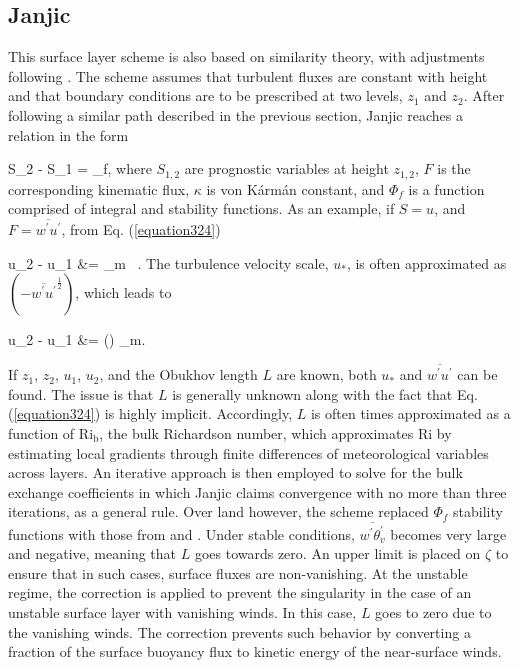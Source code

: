 \subsection{Janjic}
\label{sl-janjic-352}

This surface layer scheme is also based on  \citet{MO} similarity theory, with adjustments following  \citet{Jan94,Jan96,Jan02}. The scheme assumes that turbulent fluxes are constant with height and that boundary conditions are to be prescribed at two levels, $z_1$ and $z_2$. After following a similar path described in the previous section, Janjic reaches a relation in the form

\be
S_2 - S_1 =  \Phi_f, \label{equation324}
\ee
\noindent
 where $S_{1,2}$ are prognostic variables at height $z_{1,2}$, $F$ is the corresponding kinematic flux, $\kappa$ is von K\'{a}rm\'{a}n constant, and $\Phi_f$ is a function comprised of integral and stability functions. As an example, if $S=u$, and $F=\overline{w^{\prime}u^{\prime}}$, from Eq. (\autoref{equation324})

\bse \label{equation325}
\bal
u_2 - u_1 &= \Phi_m \mbox{ .}
\eal
\ese
\noindent
 The turbulence velocity scale, $u_*$, is often approximated as $(-\overline{w^{'}u^{'}}^\frac{1}{2})$, which leads to

\bse
\bal
u_2 - u_1 &= \left(\right) \Phi_m. \label{equation326}
\eal
\ese


If $z_1$, $z_2$, $u_1$, $u_2$, and the Obukhov length $L$ are known, both $u_*$ and $\overline{w^{\prime}u^{\prime}}$ can be found. The issue is that $L$ is generally unknown along with the fact that Eq. (\autoref{equation324}) is highly implicit. Accordingly, $L$ is often times approximated as a function of $\mathrm{Ri_b}$, the bulk Richardson number, which approximates $\mathrm{Ri}$ by estimating local gradients through finite differences of meteorological variables across layers. An iterative approach is then employed to solve for the bulk exchange coefficients in which Janjic claims convergence with no more than three iterations, as a general rule. Over land however, the scheme replaced $\Phi_f$ stability functions with those from  \citet{Dyer} and  \citet{Paulson}. Under stable conditions, $\overline{w^{'}\theta_v^{'}}$ becomes very large and negative, meaning that $L$ goes towards zero. An upper limit is placed on $\zeta$ to ensure that in such cases, surface fluxes are non-vanishing. At the unstable regime, the  \citet{Beljaars} correction is applied to prevent the singularity in the case of an unstable surface layer with vanishing winds. In this case, $L$ goes to zero due to the vanishing winds. The correction prevents such behavior by converting a fraction of the surface buoyancy flux to kinetic energy of the near-surface winds. 

